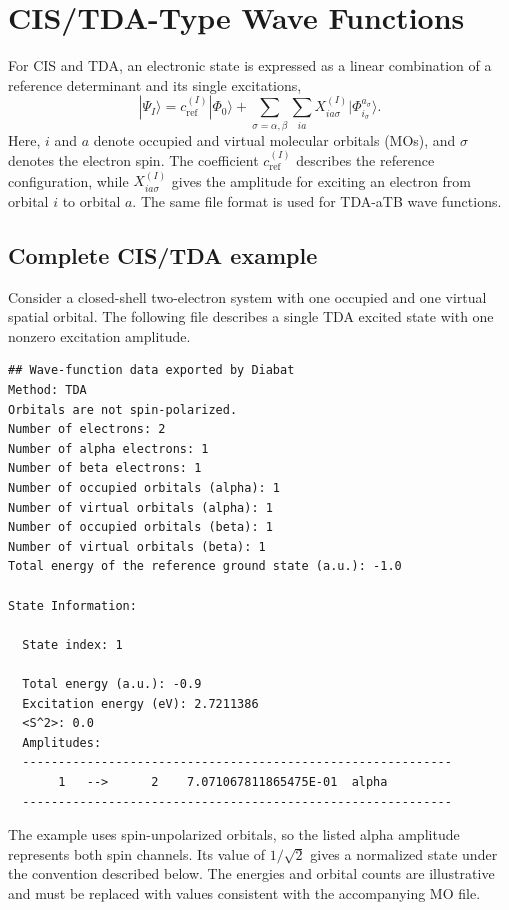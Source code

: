 \section{CIS/TDA-Type Wave Functions}\label{sec-diabat-wfn-cis-tda}
For CIS and TDA, an electronic state is expressed as a linear combination of a reference determinant and its single excitations,
\begin{equation}
|\Psi_I\rangle=c_{\mathrm{ref}}^{(I)}|\Phi_0\rangle+
\sum_{\sigma=\alpha,\beta}\sum_{ia}X_{ia\sigma}^{(I)}
|\Phi_{i_\sigma}^{a_\sigma}\rangle.
\end{equation}
Here, $i$ and $a$ denote occupied and virtual molecular orbitals (MOs), and $\sigma$ denotes the electron spin. The coefficient $c_{\mathrm{ref}}^{(I)}$ describes the reference configuration, while $X_{ia\sigma}^{(I)}$ gives the amplitude for exciting an electron from orbital $i$ to orbital $a$. The same file format is used for TDA-aTB wave functions.

\subsection*{Complete CIS/TDA example}
Consider a closed-shell two-electron system with one occupied and one virtual spatial orbital. The following file describes a single TDA excited state with one nonzero excitation amplitude.
\begin{lstlisting}[style=technicalfile]
## Wave-function data exported by Diabat
Method: TDA
Orbitals are not spin-polarized.
Number of electrons: 2
Number of alpha electrons: 1
Number of beta electrons: 1
Number of occupied orbitals (alpha): 1
Number of virtual orbitals (alpha): 1
Number of occupied orbitals (beta): 1
Number of virtual orbitals (beta): 1
Total energy of the reference ground state (a.u.): -1.0

State Information:

  State index: 1

  Total energy (a.u.): -0.9
  Excitation energy (eV): 2.7211386
  <S^2>: 0.0
  Amplitudes:
  ------------------------------------------------------------
       1   -->      2    7.071067811865475E-01  alpha
  ------------------------------------------------------------
\end{lstlisting}
The example uses spin-unpolarized orbitals, so the listed alpha amplitude represents both spin channels. Its value of $1/\sqrt{2}$ gives a normalized state under the convention described below. The energies and orbital counts are illustrative and must be replaced with values consistent with the accompanying MO file.

